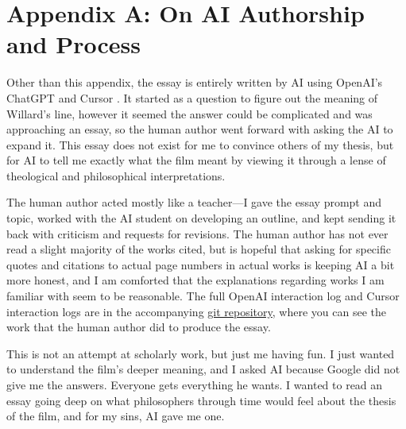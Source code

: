 \section*{Appendix A: On AI Authorship and Process}
\label{app:ai-authorship}

Other than this appendix, the essay is entirely written by AI using OpenAI's ChatGPT
\parencite{OpenAIChatGPT2024} and Cursor \parencite{CursorAI2024}. It started as a question
to figure out the meaning of Willard's line, however it seemed the answer could be complicated
and was approaching an essay, so the human author went forward with asking the AI to expand
it. This essay does not exist for me to convince others of my thesis, but for AI to tell me
exactly what the film meant by viewing it through a lense of theological and philosophical
interpretations.

The human author acted mostly like a teacher---I gave the essay prompt and topic, worked
with the AI student on developing an outline, and kept sending it back with criticism and
requests for revisions. The human author has not ever read a slight majority of the works
cited, but is hopeful that asking for specific quotes and citations to actual page numbers in
actual works is keeping AI a bit more honest, and I am comforted that the explanations
regarding works I am familiar with seem to be reasonable. The full OpenAI interaction log and
Cursor interaction logs are in the accompanying
\href{https://github.com/jmalicki/apocalypse-now-essay/tree/main/interaction-logs}{git
	repository}, where you can see the work that the human author did to produce the essay.

This is not an attempt at scholarly work, but just me having fun.
I just wanted to understand the film's deeper
meaning, and I asked AI because Google did not give me the answers.  Everyone gets everything
he wants.  I wanted to read an essay going deep on what philosophers through time would feel
about the thesis of the film, and for my sins, AI gave me one.
